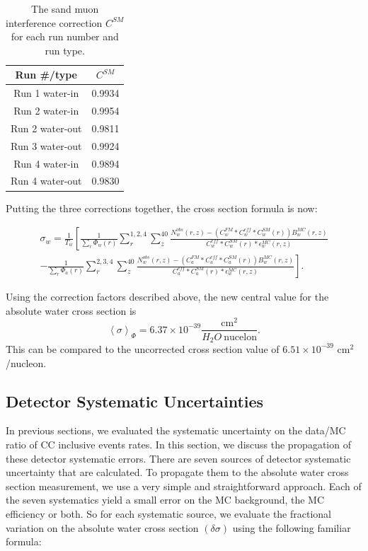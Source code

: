 \begin{table}[h]
\caption{The sand muon interference correction $C^{SM}$ for each run number and run type.}
\label{tab:smcorr}
\centering
\begin{tabular}{cc}\toprule
Run \#/type & $C^{SM}$ \\ \midrule
Run 1 water-in & 0.9934 \\
Run 2 water-in & 0.9954 \\
Run 2 water-out & 0.9811 \\
Run 3 water-out & 0.9924 \\
Run 4 water-in & 0.9894 \\
Run 4 water-out &  0.9830 \\
\bottomrule
\end{tabular}
\end{table}

Putting the three corrections together, the cross section formula is now:

\begin{multline}
\label{eqn:nomxsec}
\sigma_w = \frac{1}{T_w} \left[ \frac{1}{\sum\limits_r \Phi_w(r)}\sum\limits_{r}^{1,2,4} \sum\limits_{z}^{40} \frac{N^{obs}_w(r,z)-(C_w^{FM}*C_w^{eff}*C_w^{SM}(r))B^{MC}_w(r,z)}{C_w^{eff}*C_w^{SM}(r)*\epsilon^{MC}_w(r,z)} \right. \\
	\left. -\frac{1}{\sum\limits_r \Phi_a(r)}\sum\limits_{r}^{2,3,4} \sum\limits_{z}^{40} \frac{N^{obs}_w(r,z)-(C_a^{FM}*C_a^{eff}*C_a^{SM}(r))B^{MC}_w(r,z)}{C_a^{eff}*C_a^{SM}(r)*\epsilon^{MC}_w(r,z)}\right].
\end{multline}

Using the correction factors described above, the new central value for the absolute water cross section is
\begin{equation}
\left<\sigma\right>_\Phi = 6.37\times 10^{-39} \frac{\text{cm}^2}{H_2O\:\text{nucelon}}.
\end{equation}
This can be compared to the uncorrected cross section value of $6.51\times 10^{-39}$ cm$^2$/nucleon.

\subsection{Detector Systematic Uncertainties}

In previous sections, we evaluated the systematic uncertainty on the data/MC ratio of CC inclusive events rates. In this section, we discuss the propagation of these detector systematic errors. There are seven sources of detector systematic uncertainty that are calculated. To propagate them to the absolute water cross section measurement, we use a very simple and straightforward approach. Each of the seven systematics yield a small error on the MC background, the MC efficiency or both. So for each systematic source, we evaluate the fractional variation on the absolute water cross section $(\delta\sigma)$ using the following familiar formula:

